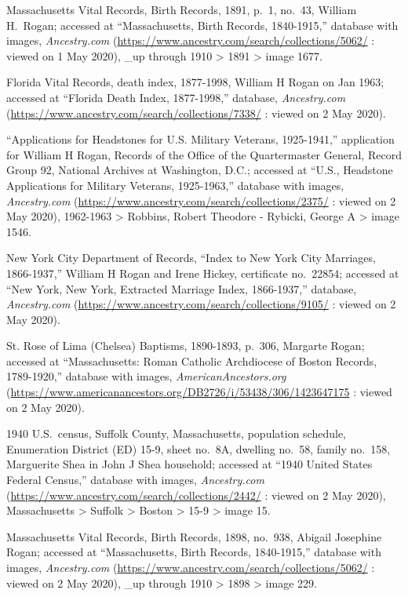 \begin{thebibliography}{999}
	Massachusetts Vital Records, Birth Records, 1891, p.\ 1, no.\ 43, William H.\ Rogan; accessed at ``Massachusetts, Birth Records, 1840-1915,'' database with images, \textit{Ancestry.com} (\url{https://www.ancestry.com/search/collections/5062/} : viewed on 1 May 2020), \_up through 1910 > 1891 > image 1677.
	
	Florida Vital Records, death index, 1877-1998, William H Rogan on Jan 1963; accessed at ``Florida Death Index, 1877-1998,'' database, \textit{Ancestry.com} (\url{https://www.ancestry.com/search/collections/7338/} : viewed on 2 May 2020).
	
	``Applications for Headstones for U.S. Military Veterans, 1925-1941,'' application for William H Rogan, Records of the Office of the Quartermaster General, Record Group 92, National Archives at Washington, D.C.; accessed at ``U.S., Headstone Applications for Military Veterans, 1925-1963,'' database with images, \textit{Ancestry.com} (\url{https://www.ancestry.com/search/collections/2375/} : viewed on 2 May 2020), 1962-1963 > Robbins, Robert Theodore - Rybicki, George A > image 1546.
	
	New York City Department of Records, ``Index to New York City Marriages, 1866-1937,'' William H Rogan and Irene Hickey, certificate no.\ 22854; accessed at ``New York, New York, Extracted Marriage Index, 1866-1937,'' database, \textit{Ancestry.com} (\url{https://www.ancestry.com/search/collections/9105/} : viewed on 2 May 2020).
	
	St. Rose of Lima (Chelsea) Baptisms, 1890-1893, p.\ 306, Margarte Rogan; accessed at ``Massachusetts: Roman Catholic Archdiocese of Boston Records, 1789-1920,'' database with images, \textit{AmericanAncestors.org} (\url{https://www.americanancestors.org/DB2726/i/53438/306/1423647175} : viewed on 2 May 2020).
	
	1940 U.S.\ census, Suffolk County, Massachusetts, population schedule, Enumeration District (ED) 15-9, sheet no.\ 8A, dwelling no.\ 58, family no.\ 158, Marguerite Shea in John J Shea household; accessed at ``1940 United States Federal Census,'' database with images, \textit{Ancestry.com} (\url{https://www.ancestry.com/search/collections/2442/} : viewed on 2 May 2020), Massachusetts > Suffolk > Boston > 15-9 > image 15.
	
	Massachusetts Vital Records, Birth Records, 1898, no.\ 938, Abigail Josephine Rogan; accessed at ``Massachusetts, Birth Records, 1840-1915,'' database with images, \textit{Ancestry.com} (\url{https://www.ancestry.com/search/collections/5062/} : viewed on 2 May 2020), \_up through 1910 > 1898 > image 229.
	

\end{thebibliography}
